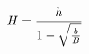\documentclass[preview]{standalone}
\begin{document}
\begin{align*}
\special{dvisvgm:raw <g id='unique000'>}H=\frac{h}{1-\sqrt{\frac{b}{B}}}\special{dvisvgm:raw </g>}
\end{align*}
\end{document}
